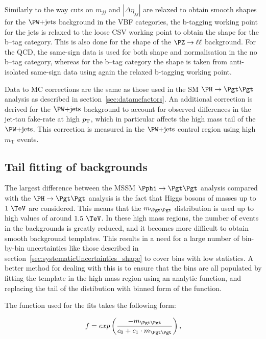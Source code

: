 Similarly to the way cuts on $m_{jj}$ and $|\Delta\eta_{jj}|$ are relaxed to
obtain smooth shapes for the $\WJets$ background in the VBF categories, the
b-tagging working point for the jets is relaxed to the loose \ac{CSV} working point to
obtain the shape for the b--tag category. This is also done for the shape of
the $\PZ\to\ell\ell$ background. For the QCD, the same-sign data is used for
both shape and normalisation in the no b--tag category, whereas for the b--tag
category the shape is taken from anti-isolated same-sign data using again the relaxed
b-tagging working point.

Data to \ac{MC} corrections are the same as those used in the \ac{SM}
$\HToTauTau$ analysis as described in section~\ref{sec:datamcfactors}. An
additional correction is derived for the $\WJets$ background to account for
observed differences in the jet-tau fake-rate at high $p_{\mathrm{T}}$, which in particular
affects the high mass tail of the $\WJets$. This correction is measured in the
$\WJets$ control region using high $m_{\mathrm{T}}$ events. 

\subsection{Tail fitting of backgrounds}
\label{sec:tailfitting}

The largest difference between the \ac{MSSM} $\Pphi\to\Pgt\Pgt$ analysis compared
with the $\HToTauTau$ analysis is the fact that Higgs bosons of
masses up to $1~\TeV$ are considered. This means that the $m_{\Pgt\Pgt}$
distribution is used up to high values of around $1.5~\TeV$. In these high mass regions, the
number of events in the backgrounds is greatly reduced, and it becomes more
difficult to obtain smooth background templates. This results in a need for a
large number of bin-by-bin uncertainties like those described in
section~\ref{sec:systematicUncertainties_shape} to cover bins with low
statistics. A better method for dealing with this is to ensure that the bins are
all populated by fitting the template in the high mass region using an analytic
function, and replacing the tail of the distibution with binned form of the function.

The function used for the fits takes the following form:

\begin{equation}
f = exp\left(\frac{-m_{\Pgt\Pgt}}{c_{0} + c_{1}\cdot m_{\Pgt\Pgt}}\right) ,
\end{equation}

